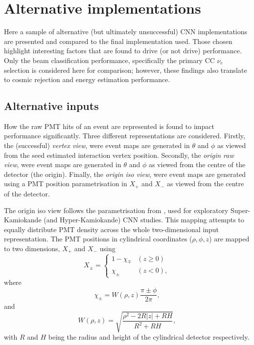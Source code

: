 \section{Alternative implementations} %
\label{sec:results_alt} %

Here a sample of alternative (but ultimately unsuccessful) \chips CNN implementations are
presented and compared to the final implementation used. Those chosen highlight interesting
factors that are found to drive (or not drive) performance. Only the beam classification
performance, specifically the primary CC $\nu_{e}$ selection is considered here for comparison;
however, these findings also translate to cosmic rejection and energy estimation performance.

\subsection{Alternative inputs} %
\label{sec:results_alt_inputs} %

How the raw PMT hits of an event are represented is found to impact performance significantly.
Three different representations are considered. Firstly, the (successful) \emph{vertex view}, were
event maps are generated in $\theta$ and $\phi$ as viewed from the seed estimated interaction
vertex position. Secondly, the \emph{origin raw view}, were event maps are generated in $\theta$
and $\phi$ as viewed from the centre of the detector (the origin). Finally, the \emph{origin iso
view}, were event maps are generated using a PMT position parametrisation in $X_{+}$ and $X_{-}$
as viewed from the centre of the detector.

The origin iso view follows the parametrisation from , used for
exploratory Super-Kamiokande (and Hyper-Kamiokande) CNN studies. This mapping attempts to equally
distribute PMT density across the whole two-dimensional input representation. The PMT positions in
cylindrical coordinates ($\rho,\phi,z$) are mapped to two dimensions, $X_{+}$ and $X_{-}$ using
\begin{equation} %
    X_{\pm}=
    \begin{cases}
        1-\chi_{\mp} & (z \geq 0) \\
        \chi_{\pm}   & (z < 0),
    \end{cases}
    \label{eq:iso_case}
\end{equation}
where
\begin{equation} %
    \chi_{\pm}=W(\rho,z)\frac{\pi\pm\phi}{2\pi},
    \label{eq:iso_main}
\end{equation}
and
\begin{equation} %
    W(\rho,z)=\sqrt{\frac{\rho^{2}-2R|z|+RH}{R^{2}+RH}},
    \label{eq:iso_part}
\end{equation}
with $R$ and $H$ being the radius and height of the cylindrical detector respectively.

